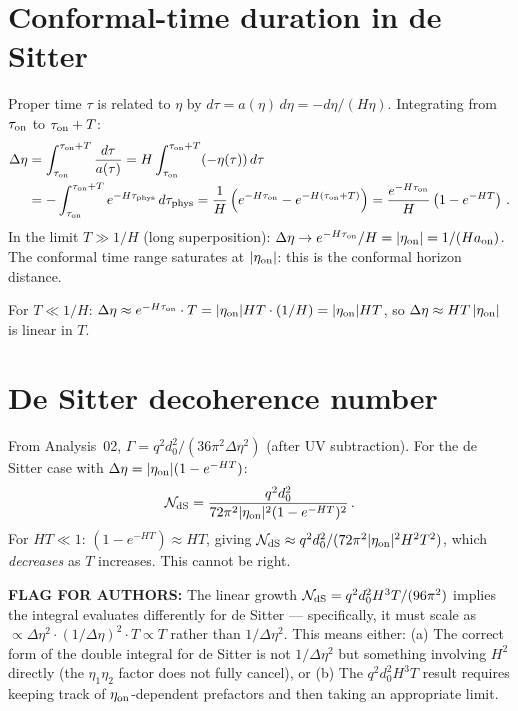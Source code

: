 \documentclass[12pt]{article}
\newcommand{\Scfac}{a}
\newcommand{\Nnum}{\mathcal{N}}
\newcommand{\lb}{\left}
\newcommand{\rb}{\right}
\begin{document}
\section*{Conformal-time duration in de Sitter}

Proper time $\tau$ is related to $\eta$ by
$d\tau = \Scfac(\eta)\,d\eta = -d\eta/(H\eta)$.
Integrating from $\tau_{\rm on}$ to $\tau_{\rm on}+T$:
%
\begin{align}
  \Delta\eta
  &=
  \int_{\tau_{\rm on}}^{\tau_{\rm on}+T}\frac{d\tau}{\Scfac(\tau)}
  = H\int_{\tau_{\rm on}}^{\tau_{\rm on}+T}(-\eta(\tau))\,d\tau \nonumber\\
  &=
  -\int_{\tau_{\rm on}}^{\tau_{\rm on}+T}e^{-H\tau_{\rm phys}}\,d\tau_{\rm phys}
  = \frac{1}{H}\lb(e^{-H\tau_{\rm on}} - e^{-H(\tau_{\rm on}+T)}\rb)
  = \frac{e^{-H\tau_{\rm on}}}{H}\lb(1-e^{-HT}\rb) \,.
  \label{eq:Delta-eta-dS}
\end{align}
%
In the limit $T\gg 1/H$ (long superposition):
$\Delta\eta \to e^{-H\tau_{\rm on}}/H = |\eta_{\rm on}| = 1/(H\Scfac_{\rm on})$.
The conformal time range saturates at $|\eta_{\rm on}|$: this is the conformal
horizon distance.

For $T\ll 1/H$:
$\Delta\eta \approx e^{-H\tau_{\rm on}}\cdot T = |\eta_{\rm on}| HT \cdot (1/H) = |\eta_{\rm on}|HT$,
so $\Delta\eta \approx HT\,|\eta_{\rm on}|$ is linear in $T$.

\section*{De Sitter decoherence number}

From Analysis~02, $\Gamma = q^{2}d_{0}^{2}/(36\pi^{2}\Delta\eta^{2})$ (after UV subtraction).
For the de Sitter case with $\Delta\eta = |\eta_{\rm on}|(1-e^{-HT})$:
%
\begin{equation}
  \Nnum_{\rm dS}
  =
  \frac{q^{2}d_{0}^{2}}{72\pi^{2}|\eta_{\rm on}|^{2}(1-e^{-HT})^{2}} \,.
\end{equation}
%
For $HT\ll 1$: $(1-e^{-HT})\approx HT$, giving
$\Nnum_{\rm dS}\approx q^{2}d_{0}^{2}/(72\pi^{2}|\eta_{\rm on}|^{2}H^{2}T^{2})$,
which \emph{decreases} as $T$ increases.  This cannot be right.

\textbf{FLAG FOR AUTHORS:} The linear growth $\Nnum_{\rm dS} = q^{2}d_{0}^{2}H^{3}T/(96\pi^{2})$
implies the integral evaluates differently for de Sitter — specifically, it must scale as
$\propto \Delta\eta^{2}\cdot(1/\Delta\eta)^{2}\cdot T \propto T$ rather than $1/\Delta\eta^{2}$.
This means either:
(a) The correct form of the double integral for de Sitter is not $1/\Delta\eta^{2}$ but
    something involving $H^{2}$ directly (the $\eta_{1}\eta_{2}$ factor does not fully cancel),
    or
(b) The $q^{2}d_{0}^{2}H^{3}T$ result requires keeping track of $\eta_{\rm on}$-dependent
    prefactors and then taking an appropriate limit.
\end{document}
